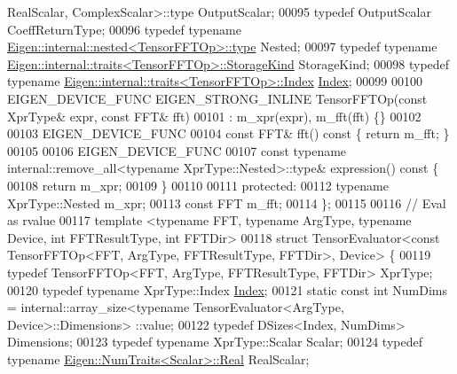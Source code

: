 \begin{DoxyCode}
       RealScalar, ComplexScalar>::type OutputScalar;
00095   \textcolor{keyword}{typedef} OutputScalar CoeffReturnType;
00096   \textcolor{keyword}{typedef} \textcolor{keyword}{typename} \hyperlink{class_eigen_1_1internal_1_1_tensor_lazy_evaluator_writable}{Eigen::internal::nested<TensorFFTOp>::type} 
      Nested;
00097   \textcolor{keyword}{typedef} \textcolor{keyword}{typename} \hyperlink{struct_eigen_1_1internal_1_1traits}{Eigen::internal::traits<TensorFFTOp>::StorageKind}
       StorageKind;
00098   \textcolor{keyword}{typedef} \textcolor{keyword}{typename} \hyperlink{struct_eigen_1_1internal_1_1traits}{Eigen::internal::traits<TensorFFTOp>::Index} 
      \hyperlink{namespace_eigen_a62e77e0933482dafde8fe197d9a2cfde}{Index};
00099 
00100   EIGEN\_DEVICE\_FUNC EIGEN\_STRONG\_INLINE TensorFFTOp(\textcolor{keyword}{const} XprType& expr, \textcolor{keyword}{const} FFT& fft)
00101       : m\_xpr(expr), m\_fft(fft) \{\}
00102 
00103   EIGEN\_DEVICE\_FUNC
00104   \textcolor{keyword}{const} FFT& fft()\textcolor{keyword}{ const }\{ \textcolor{keywordflow}{return} m\_fft; \}
00105 
00106   EIGEN\_DEVICE\_FUNC
00107   \textcolor{keyword}{const} \textcolor{keyword}{typename} internal::remove\_all<typename XprType::Nested>::type& expression()\textcolor{keyword}{ const }\{
00108     \textcolor{keywordflow}{return} m\_xpr;
00109   \}
00110 
00111  \textcolor{keyword}{protected}:
00112   \textcolor{keyword}{typename} XprType::Nested m\_xpr;
00113   \textcolor{keyword}{const} FFT m\_fft;
00114 \};
00115 
00116 \textcolor{comment}{// Eval as rvalue}
00117 \textcolor{keyword}{template} <\textcolor{keyword}{typename} FFT, \textcolor{keyword}{typename} ArgType, \textcolor{keyword}{typename} Device, \textcolor{keywordtype}{int} FFTResultType, \textcolor{keywordtype}{int} FFTDir>
00118 \textcolor{keyword}{struct }TensorEvaluator<const TensorFFTOp<FFT, ArgType, FFTResultType, FFTDir>, Device> \{
00119   \textcolor{keyword}{typedef} TensorFFTOp<FFT, ArgType, FFTResultType, FFTDir> XprType;
00120   \textcolor{keyword}{typedef} \textcolor{keyword}{typename} XprType::Index \hyperlink{namespace_eigen_a62e77e0933482dafde8fe197d9a2cfde}{Index};
00121   \textcolor{keyword}{static} \textcolor{keyword}{const} \textcolor{keywordtype}{int} NumDims = internal::array\_size<typename TensorEvaluator<ArgType, Device>::Dimensions>
      ::value;
00122   \textcolor{keyword}{typedef} DSizes<Index, NumDims> Dimensions;
00123   \textcolor{keyword}{typedef} \textcolor{keyword}{typename} XprType::Scalar Scalar;
00124   \textcolor{keyword}{typedef} \textcolor{keyword}{typename} \hyperlink{group___sparse_core___module}{Eigen::NumTraits<Scalar>::Real} RealScalar;

\end{DoxyCode}
